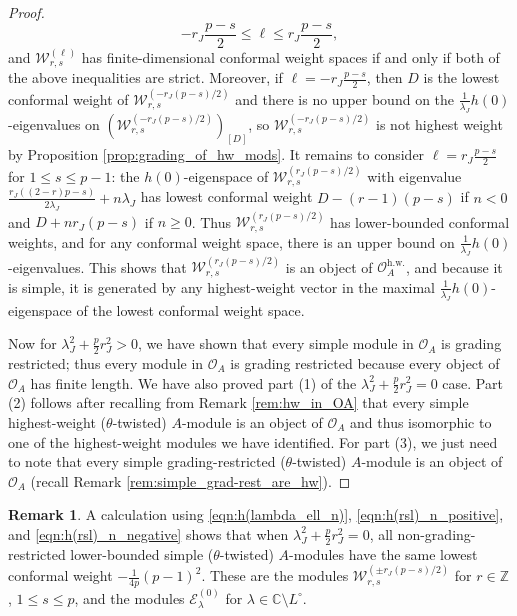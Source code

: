 \documentclass[11pt, reqno]{amsart}
\theoremstyle{definition}\newtheorem{defi}[thm]{Definition}
\theoremstyle{definition}\newtheorem{rem}[thm]{Remark}
\theoremstyle{definition}\newtheorem{exam}[thm]{Example}
\theoremstyle{definition}\newtheorem{assum}[thm]{Assumption}
\newcommand{\cE}{\mathcal{E}}
\newcommand{\cO}{\mathcal{O}}
\newcommand{\cW}{\mathcal{W}}
\newcommand{\CC}{\mathbb{C}}
\newcommand{\ZZ}{\mathbb{Z}}
\begin{document}
\begin{proof}
\begin{equation*}
-r_J\frac{p-s}{2}\leq \ell\leq r_J\frac{p-s}{2},
\end{equation*}
and $\cW_{r,s}^{(\ell)}$ has finite-dimensional conformal weight spaces if and only if both of the above inequalities are strict. Moreover, if $\ell=-r_J\frac{p-s}{2}$, then $D$ is the lowest conformal weight of $\cW_{r,s}^{(-r_J(p-s)/2)}$ and there is no upper bound on the $\frac{1}{\lambda_J}h(0)$-eigenvalues on $(\cW_{r,s}^{(-r_J(p-s)/2)})_{[D]}$, so $\cW_{r,s}^{(-r_J(p-s)/2)}$ is not highest weight by Proposition \ref{prop:grading_of_hw_mods}. It remains to consider $\ell=r_J\frac{p-s}{2}$ for $1\leq s\leq p-1$: the $h(0)$-eigenspace of $\cW_{r,s}^{(r_J(p-s)/2)}$ with eigenvalue $\frac{r_J((2-r)p-s)}{2\lambda_J}+n\lambda_J$ has lowest conformal weight $D-(r-1)(p-s)$ if $n<0$ and $D+nr_J(p-s)$ if $n\geq 0$. Thus $\cW_{r,s}^{(r_J(p-s)/2)}$ has lower-bounded conformal weights, and for any conformal weight space, there is an upper bound on $\frac{1}{\lambda_J}h(0)$-eigenvalues. This shows that $\cW_{r,s}^{(r_J(p-s)/2)}$ is an object of $\cO_A^{\mathrm{h.w.}}$, and because it is simple, it is generated by any highest-weight vector in the maximal $\frac{1}{\lambda_J}h(0)$-eigenspace of the lowest conformal weight space.


Now for $\lambda_J^2+\frac{p}{2}r_J^2>0$, we have shown that every simple module in $\cO_A$ is grading restricted; thus every module in $\cO_A$ is grading restricted because every object of $\cO_A$ has finite length. We have also proved part (1) of the $\lambda_J^2+\frac{p}{2}r_J^2=0$ case. Part (2) follows after recalling from Remark \ref{rem:hw_in_OA} that every simple highest-weight ($\theta$-twisted) $A$-module is an object of $\cO_A$ and thus isomorphic to one of the highest-weight modules we have identified. For part (3), we just need to note that every simple grading-restricted ($\theta$-twisted) $A$-module is an object of $\cO_A$ (recall Remark \ref{rem:simple_grad-rest_are_hw}).
\end{proof}

\begin{rem}\label{rem:low-bound_conf_wts}
A calculation using \eqref{eqn:h(lambda_ell_n)}, \eqref{eqn:h(rsl)_n_positive}, and \eqref{eqn:h(rsl)_n_negative} shows that when $\lambda_J^2+\frac{p}{2}r_J^2=0$, all non-grading-restricted lower-bounded simple ($\theta$-twisted) $A$-modules have the same lowest conformal weight $-\frac{1}{4p}(p-1)^2$. These are the modules $\cW_{r,s}^{(\pm r_J(p-s)/2)}$ for $r\in\ZZ$, $1\leq s\leq p$, and the modules $\cE^{(0)}_\lambda$ for $\lambda\in\CC\setminus L^\circ$. 
\end{rem}
\end{document}
